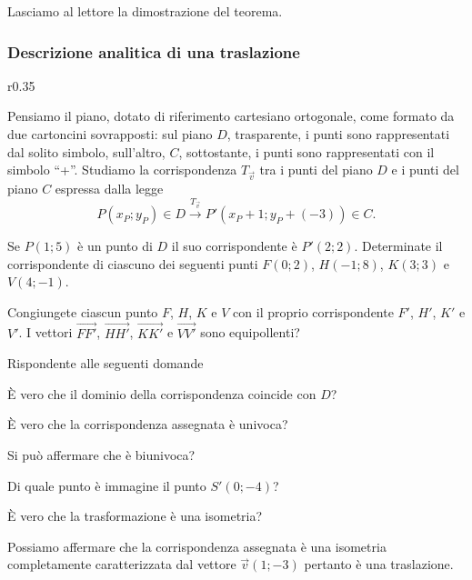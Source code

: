 Lasciamo al lettore la dimostrazione del teorema.
\pagebreak
\subsubsection{Descrizione analitica di una traslazione}

\setlength{\intextsep}{3pt plus 2.0pt minus 2.0pt}
\begin{wrapfigure}{r}{0.35\textwidth}
	
\centering
\end{wrapfigure}
Pensiamo il piano, dotato di riferimento cartesiano ortogonale, come 
formato da due cartoncini sovrapposti: sul piano $D$, trasparente, i 
punti sono rappresentati dal solito simbolo, sull'altro, $C$, 
sottostante, i punti sono rappresentati con il simbolo ``+''.
Studiamo la corrispondenza $T_{\vec{v}}$ tra i punti del piano $D$ e 
i punti del piano $C$ espressa dalla legge
\[P(x_P;y_P)\in D \overset{T_{\vec{v}}}\rightarrow 
P'(x_P+1;y_P+(-3))\in C.\]


Se $P(1;5)$ è un punto di $D$ il suo corrispondente è $P'(2;2)$. 
Determinate il corrispondente di ciascuno dei seguenti punti 
$F(0;2)$, $H(-1;8)$, $K(3;3)$ e $V(4;-1)$.

Congiungete ciascun punto $F$, $H$, $K$ e $V$ con il proprio 
corrispondente $F'$, $H'$, $K'$ e $V'$. I vettori 
$\overrightarrow{FF'}$, $\overrightarrow{HH'}$, 
$\overrightarrow{KK'}$ e $\overrightarrow{VV'}$ sono equipollenti?

Rispondente alle seguenti domande
\begin{itemize*}
\item \`E vero che il dominio della corrispondenza coincide con $D$?
\item \`E vero che la corrispondenza assegnata è univoca?
\item Si può affermare che è biunivoca?
\item Di quale punto è immagine il punto $S'(0;-4)$?
\item \`E vero che la trasformazione è una isometria?
\end{itemize*}

Possiamo affermare che la corrispondenza assegnata è una isometria 
completamente caratterizzata dal vettore $\vec{v}(1;-3)$ pertanto è 
una traslazione.

